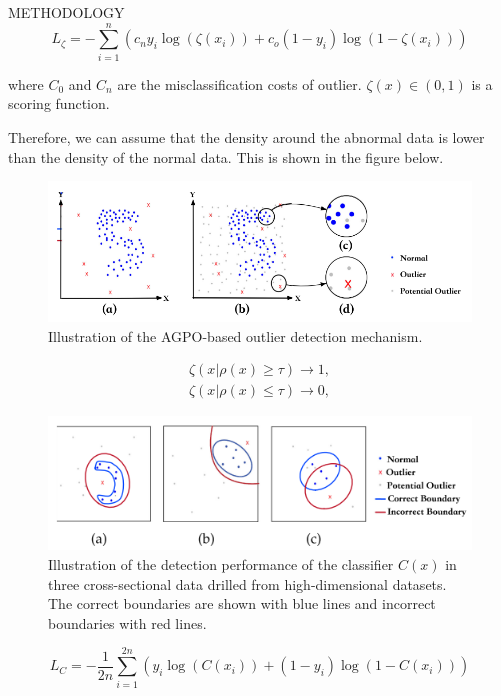\documentclass[final]{beamer}
\newlength{\colwidth}
\begin{document}
\begin{frame}[t]
\begin{columns}[t]
\begin{column}{\colwidth}
\begin{alertblock}{METHODOLOGY}
	$$
	L_{\zeta}= -\sum_{i=1}^{n}(c_ny_i\log(\zeta(x_i))+c_o(1-y_i)\log(1-\zeta(x_i)))
	$$
	
	where $C_0$ and $C_n$ are the misclassification costs of outlier. $\zeta(x)\in(0,1)$ is a scoring function.
	
	Therefore, we can assume that the density around the abnormal data is lower than the density of the normal data. This is shown in the figure below.
	
	\begin{figure}
		\centering
		\includegraphics[scale=1]{figures/figure 1.png}
		\caption{Illustration of the AGPO-based outlier detection mechanism.}
	\end{figure}

	\begin{equation}\nonumber
		\begin{aligned}
			\zeta(x|\rho(x)\geq\tau)\rightarrow1,\\
			\zeta(x|\rho(x)\leq\tau)\rightarrow0,
		\end{aligned}
	\end{equation}
    \begin{figure}
	    \centering
	    \includegraphics[scale=1.5]{figures/figure 2.png}
	    \caption{Illustration of the detection performance of the classifier $C(x)$ in three cross-sectional data drilled from high-dimensional datasets. The correct boundaries are shown with blue lines and incorrect boundaries with red lines. }
    \end{figure}
	$$
	L_C= -\frac{1}{2n}\sum_{i=1}^{2n}(y_i\log(C(x_i))+(1-y_i)\log(1-C(x_i)))
	$$
  \end{alertblock}


\end{column}
\end{columns}
\end{frame}
\end{document}
